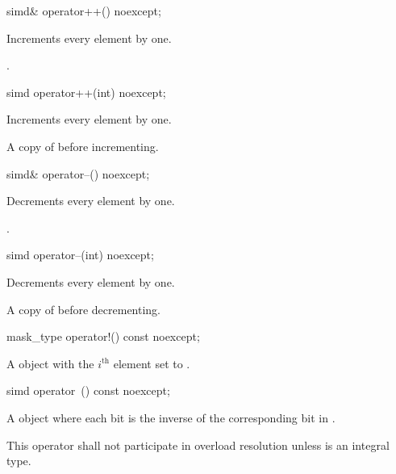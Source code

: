 \begin{itemdecl}
simd& operator++() noexcept;
\end{itemdecl}

\begin{itemdescr}
  \pnum\effects
  Increments every element by one.

  \pnum\returns
  .
\end{itemdescr}

\begin{itemdecl}
simd operator++(int) noexcept;
\end{itemdecl}

\begin{itemdescr}
  \pnum\effects
  Increments every element by one.

  \pnum\returns
  A copy of  before incrementing.
\end{itemdescr}

\begin{itemdecl}
simd& operator--() noexcept;
\end{itemdecl}

\begin{itemdescr}
  \pnum\effects
  Decrements every element by one.

  \pnum\returns
  .
\end{itemdescr}

\begin{itemdecl}
simd operator--(int) noexcept;
\end{itemdecl}

\begin{itemdescr}
  \pnum\effects
  Decrements every element by one.

  \pnum\returns
  A copy of  before decrementing.
\end{itemdescr}

\begin{itemdecl}
mask_type operator!() const noexcept;
\end{itemdecl}

\begin{itemdescr}
  \pnum\returns
  A  object with the $i^\text{th}$ element set to  \foralli.
\end{itemdescr}

\begin{itemdecl}
simd operator~() const noexcept;
\end{itemdecl}

\begin{itemdescr}
  \pnum\returns
  A  object where each bit is the inverse of the corresponding bit in .

  \pnum\remarks
  This operator shall not participate in overload resolution unless  is an integral type.
\end{itemdescr}

